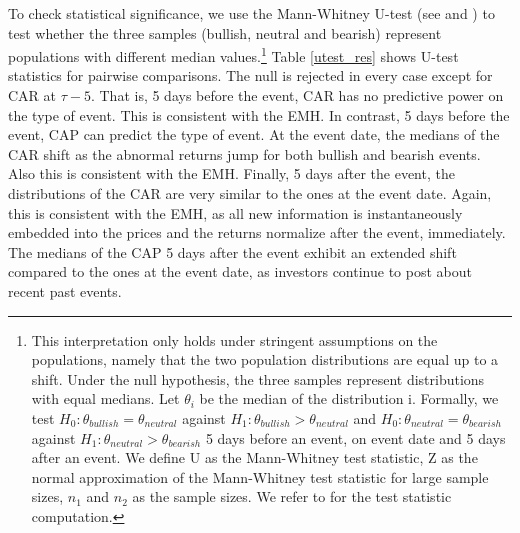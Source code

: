 To check statistical significance, we use the Mann-Whitney U-test (see \citet{utest} and \citet{sheskin}) to test whether the three samples (bullish, neutral and bearish) represent populations with different median values.\footnote{This interpretation only holds under stringent assumptions on the populations, namely that the two population distributions are equal up to a shift. Under the null hypothesis, the three samples represent distributions with equal medians. Let $\theta_i$ be the median of the distribution i. Formally, we test $H_0 : \theta_{bullish} = \theta_{neutral}$ against $H_1 : \theta_{bullish} > \theta_{neutral}$ and $H_0 : \theta_{neutral} = \theta_{bearish}$ against $H_1 : \theta_{neutral} > \theta_{bearish}$ 5 days before an event, on event date and 5 days after an event. We define U as the Mann-Whitney test statistic, Z as the normal approximation of the Mann-Whitney test statistic for large sample sizes, $n_1$ and $n_2$ as the sample sizes. We refer to \citet{sheskin} for the test statistic computation.}
Table \ref{utest_res} shows U-test statistics for pairwise comparisons. The null is rejected in every case except for CAR at $\tau-5$. That is, 5 days before the event, CAR has no predictive power on the type of event. This is consistent with the EMH. In contrast, 5 days before the event, CAP can predict the type of event. At the event date, the medians of the CAR shift as the abnormal returns jump for both bullish and bearish events. Also this is consistent with the EMH. Finally, 5 days after the event, the distributions of the CAR are very similar to the ones at the event date. Again, this is consistent with the EMH, as all new information is instantaneously embedded into the prices and the returns normalize after the event, immediately. The medians of the CAP 5 days after the event exhibit an extended shift compared to the ones at the event date, as investors continue to post about recent past events.






